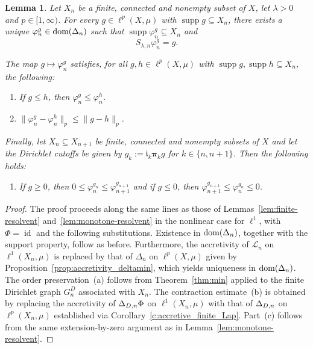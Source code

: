 \documentclass[letterpaper]{article}
\newtheorem{lemma}{Lemma}[section]
\theoremstyle{definition}
\theoremstyle{named}
\numberwithin{equation}{section}
\newcommand{\dom}{\textnormal{dom}} %
\newcommand{\Lmin}{\mathcal{L}_{n}}
\newcommand{\Deltadir}[1][]{\Delta_{D\ifx&#1&\else,#1\fi}}
\begin{document}
\begin{lemma}\label{lem:finite-resolvent2}
Let $X_n$ be a finite, connected and nonempty subset of $X$, let
$\lambda>0$ and $p\in[1,\infty)$. For every $g\in\ell^p(X,\mu)$
with $\operatorname{supp}g\subseteq X_n$, there exists a unique
$\varphi_n^g\in\dom(\Delta_n)$ such that $\operatorname{supp}\varphi_n^g\subseteq X_n$ and
\[
S_{\lambda,n}\varphi_n^g=g.
\]

The map $g\mapsto\varphi_n^g$ satisfies, for all
$g,h\in\ell^p(X,\mu)$ with $\operatorname{supp}g,\operatorname{supp}h\subseteq X_n$, the
following:
\begin{enumerate}[label=\textup{(\alph*)},leftmargin=2.4em]
\item If $g\le h$, then $\varphi_n^g\le \varphi_n^h$.
\item $\|\varphi_n^g-\varphi_n^h\|_p\leq \|g-h\|_p$.
\end{enumerate}
Finally, let $X_n\subseteq X_{n+1}$ be finite, connected and nonempty subsets of $X$ and let the 
Dirichlet cutoffs be given by
$g_k:=\boldsymbol{\mathfrak i}_k\boldsymbol{\pi}_k g$ for $k\in\{n,n+1\}$. Then the following holds:
\begin{enumerate}[label=\textup{(\alph*)},leftmargin=2.4em,start=3]
\item If $g\ge 0$, then $0\le \varphi_n^{g_n}\le \varphi_{n+1}^{g_{n+1}}$ and if $g\le 0$,
then $\varphi_{n+1}^{g_{n+1}}\le \varphi_n^{g_n}\le 0$.
\end{enumerate}
\end{lemma}
\begin{proof}
The proof proceeds along the same lines as those of Lemmas~\ref{lem:finite-resolvent}
and~\ref{lem:monotone-resolvent} in the nonlinear case for $\ell^1$, with
$\Phi=\operatorname{id}$ and the following substitutions. Existence in
$\dom(\Delta_n)$, together with the support property, follow as before. Furthermore,
the accretivity of $\Lmin$ on $\ell^1(X_n,\mu)$ is replaced by that of $\Delta_n$ on
$\ell^p(X,\mu)$ given by Proposition~\ref{prop:accretivity_deltamin}, which yields
uniqueness in $\dom(\Delta_n)$.  The order preservation~(a) follows from
{ Theorem~\ref{thm:min} applied to the finite Dirichlet graph
$G_n^{D}$ associated with $X_n$}. The contraction
estimate~(b) is obtained by replacing the accretivity of $\Deltadir[n]\Phi$ on
$\ell^1(X_n,\mu)$ with that of $\Deltadir[n]$ on $\ell^p(X_n,\mu)$ established
via Corollary~\ref{c:accretive_finite_Lap}.  Part~(c) follows from the same extension-by-zero argument
as in Lemma~\ref{lem:monotone-resolvent}.
\end{proof}
\end{document}
